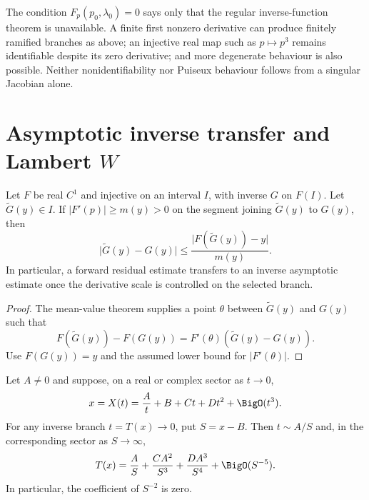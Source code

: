 \begin{warning}
\label{warn:uq-singular-jacobian}
The condition \(F_p(p_0,\lambda_0)=0\) says only that the regular
inverse-function theorem is unavailable.  A finite first nonzero derivative
can produce finitely ramified branches as above; an injective real map such
as \(p\mapsto p^3\) remains identifiable despite its zero derivative; and
more degenerate behaviour is also possible.  Neither nonidentifiability nor
Puiseux behaviour follows from a singular Jacobian alone.
\end{warning}

\section{\texorpdfstring{Asymptotic inverse transfer and Lambert \(W\)}{Asymptotic inverse transfer and Lambert W}}
\label{sec:uq-asymptotic-transfer}

\begin{proposition}
\label{prop:uq-asymptotic-residual-transfer}
Let \(F\) be real \(C^1\) and injective on an interval \(I\), with inverse
\(G\) on \(F(I)\).  Let \(\widetilde G(y)\in I\).  If
\(\lvert F'(p)\rvert\ge m(y)>0\) on the segment joining
\(\widetilde G(y)\) to \(G(y)\), then
\[
 \lvert\widetilde G(y)-G(y)\rvert
 \le
 \frac{\lvert F(\widetilde G(y))-y\rvert}{m(y)}.
\]
In particular, a forward residual estimate transfers to an inverse
asymptotic estimate once the derivative scale is controlled on the selected
branch.
\end{proposition}

\begin{proof}
The mean-value theorem supplies a point \(\theta\) between
\(\widetilde G(y)\) and \(G(y)\) such that
\[
 F(\widetilde G(y))-F(G(y))
 =F'(\theta)(\widetilde G(y)-G(y)).
\]
Use \(F(G(y))=y\) and the assumed lower bound for
\(\lvert F'(\theta)\rvert\).
\end{proof}

\begin{theorem}
\label{thm:uq-reciprocal-log-reversion}
Let \(A\ne0\) and suppose, on a real or complex sector as \(t\to0\),
\[
 x=X(t)=\frac{A}{t}+B+Ct+Dt^2+\BigO(t^3).
\]
For any inverse branch \(t=T(x)\to0\), put \(S=x-B\).  Then
\(t\sim A/S\) and, in the corresponding sector as \(S\to\infty\),
\begin{equation}
\label{eq:uq-reciprocal-reversion}
 T(x)=\frac{A}{S}+\frac{CA^2}{S^3}
 +\frac{DA^3}{S^4}+\BigO(S^{-5}).
\end{equation}
In particular, the coefficient of \(S^{-2}\) is zero.
\end{theorem}

